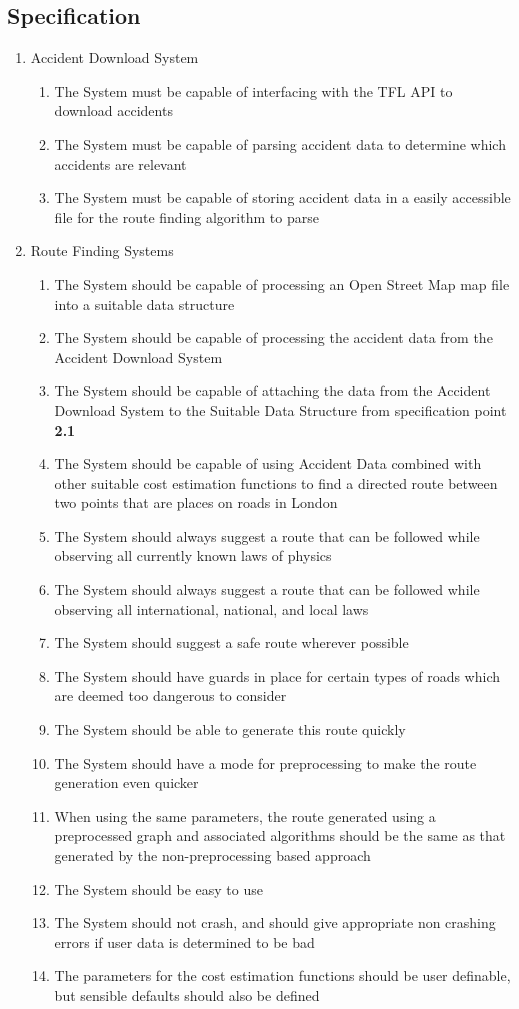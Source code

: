 \subsection{Specification}
\begin{enumerate}
\item Accident Download System
\begin{enumerate}
    \item The System must be capable of interfacing with the TFL API to download accidents
    \item The System must be capable of parsing accident data to determine which accidents are relevant
    \item The System must be capable of storing accident data in a easily accessible file for the route finding algorithm to parse
\end{enumerate} 
\item Route Finding Systems
\begin{enumerate}
    \item  The System should be capable of processing an Open Street Map map file into a suitable data structure
    \item The System should be capable of processing the accident data from the Accident Download System
    \item The System should be capable of attaching the data from the Accident Download System to the Suitable Data Structure from specification point \textbf{2.1}
    \item The System should be capable of using Accident Data combined with other suitable cost estimation functions to find a directed route between two points that are places on roads in London
    \item The System should always suggest a route that can be followed while observing all currently known laws of physics
    \item The System should always suggest a route that can be followed while observing all international, national, and local laws
    \item The System should suggest a safe route wherever possible
    \item The System should have guards in place for certain types of roads which are deemed too dangerous to consider
    \item The System should be able to generate this route quickly
    \item The System should have a mode for preprocessing to make the route generation even quicker
    \item When using the same parameters, the route generated using a preprocessed graph and associated algorithms should be the same as that generated by the non-preprocessing based approach
    \item The System should be easy to use
    \item The System should not crash, and should give appropriate non crashing errors if user data is determined to be bad
    \item The parameters for the cost estimation functions should be user definable, but sensible defaults should also be defined
\end{enumerate}
\end{enumerate}
\newpage
